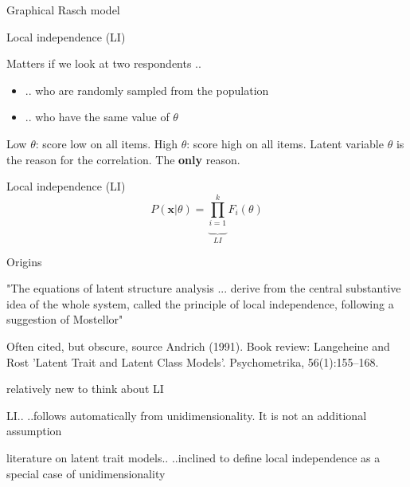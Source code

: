 \documentclass[xcolor=table]{beamer}
\begin{document}
\begin{frame}{Graphical Rasch model}

\end{frame}



\begin{frame}{Local independence (LI)}
\begin{block}{Matters if we look at two respondents ..}
\begin{itemize}
\item .. who are randomly sampled from the population
\item .. who have the same value of $\theta$
\end{itemize}
Low $\theta$: score low on all items. High $\theta$: score high on all items. 
Latent variable $\theta$ is the reason for the correlation. 
The \textbf{only} reason.
\end{block}
\begin{block}{Local independence (LI)}
$$
P(\boldsymbol{x}|\theta)=\underbrace{\prod_{i=1}^k}_{LI}F_i(\theta)
$$
\end{block}
\end{frame}

\begin{frame}{Origins}
\begin{block}{"The equations of latent structure analysis}
... derive  from the central substantive idea of the whole system, called the principle of local independence, following a suggestion of Mostellor"
\end{block}
\begin{block}{Often cited, but obscure, source}
Andrich (1991).
Book review: Langeheine and Rost ’Latent Trait and Latent
Class Models’.
Psychometrika, 56(1):155–168.    
\end{block}

\end{frame}

\begin{frame}{relatively new to think about LI}
\begin{block}{LI..}
..follows automatically from unidimensionality. It is not an additional assumption
\end{block}
\begin{block}{literature on latent trait models..}
..inclined to define local independence as a special case of unidimensionality
\end{block}
\end{frame}
\end{document}
